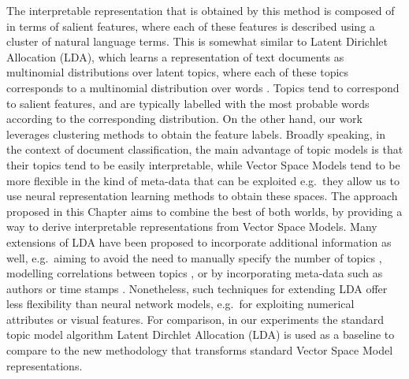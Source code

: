 






The interpretable representation that is obtained by this method is composed of in terms of salient features, where each of these features is described using a cluster of natural language terms. This is somewhat similar to Latent Dirichlet Allocation (LDA), which learns a representation of text documents as multinomial distributions over latent topics, where each of these topics corresponds to a multinomial distribution over words \cite{Blei03latentdirichlet}.  Topics tend to correspond to salient features, and are typically labelled with the most probable words according to the corresponding distribution. On the other hand, our work leverages clustering methods to obtain the feature labels. Broadly speaking, in the context of document classification, the main advantage of topic models is that their topics tend to be easily interpretable, while Vector Space Models tend to be more flexible in the kind of meta-data that can be exploited e.g.\ they allow us to use neural representation learning methods to obtain these spaces. The approach proposed in this Chapter aims to combine the best of both worlds, by providing a way to derive interpretable representations from Vector Space Models.  Many extensions of LDA have been proposed to incorporate additional information as well, e.g.\ aiming to avoid the need to manually specify the number of topics \cite{teh2005sharing}, modelling correlations between topics \cite{Blei2006}, or by incorporating meta-data such as authors or time stamps \cite{rosen2004author,wang2006topics}. Nonetheless, such techniques for extending LDA offer less flexibility than neural network models, e.g.\ for exploiting numerical attributes or visual features. For comparison, in our experiments the standard topic model algorithm Latent Dirchlet Allocation (LDA) is used as a baseline to  compare to the new methodology that transforms standard Vector Space Model representations. %


